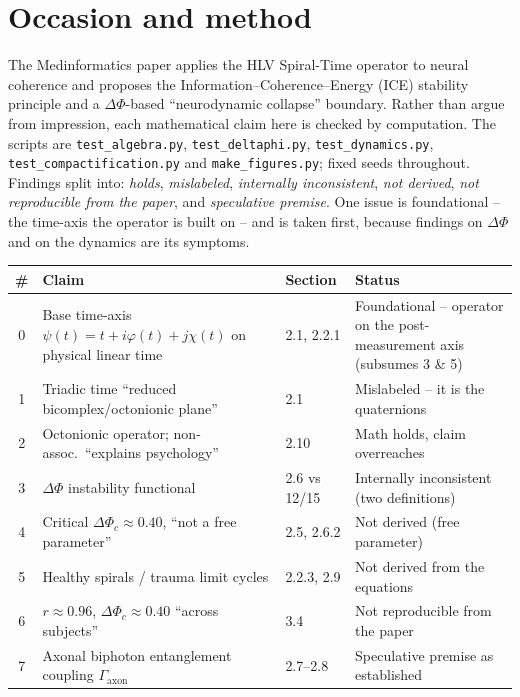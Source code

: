 \section{Occasion and method}
The Medinformatics paper applies the HLV Spiral-Time operator to neural coherence and
proposes the Information--Coherence--Energy (ICE) stability principle and a
$\Delta\Phi$-based ``neurodynamic collapse'' boundary. Rather than argue from
impression, each mathematical claim here is checked by computation. The scripts are
\texttt{test\_algebra.py}, \texttt{test\_deltaphi.py}, \texttt{test\_dynamics.py},
\texttt{test\_compactification.py} and \texttt{make\_figures.py}; fixed seeds throughout.
Findings split into: \emph{holds}, \emph{mislabeled}, \emph{internally inconsistent},
\emph{not derived}, \emph{not reproducible from the paper}, and \emph{speculative
premise}. One issue is foundational -- the time-axis the operator is built on -- and is
taken first, because findings on $\Delta\Phi$ and on the dynamics are its symptoms.

\begin{center}\small
\renewcommand{\arraystretch}{1.25}
\begin{tabular}{@{}c p{4.1cm} p{1.7cm} p{5.0cm}@{}}
\toprule
\# & Claim & Section & Status\\
\midrule
0 & Base time-axis $\psi(t)=t+i\varphi(t)+j\chi(t)$ on physical linear time & 2.1, 2.2.1 & Foundational -- operator on the post-measurement axis (subsumes 3 \& 5)\\
1 & Triadic time ``reduced bicomplex/octonionic plane'' & 2.1 & Mislabeled -- it is the quaternions\\
2 & Octonionic operator; non-assoc.\ ``explains psychology'' & 2.10 & Math holds, claim overreaches\\
3 & $\Delta\Phi$ instability functional & 2.6 vs 12/15 & Internally inconsistent (two definitions)\\
4 & Critical $\Delta\Phi_c\approx0.40$, ``not a free parameter'' & 2.5, 2.6.2 & Not derived (free parameter)\\
5 & Healthy spirals / trauma limit cycles & 2.2.3, 2.9 & Not derived from the equations\\
6 & $r\approx0.96$, $\Delta\Phi_c\approx0.40$ ``across subjects'' & 3.4 & Not reproducible from the paper\\
7 & Axonal biphoton entanglement coupling $\Gamma_{\text{axon}}$ & 2.7--2.8 & Speculative premise as established\\
\bottomrule
\end{tabular}
\end{center}

